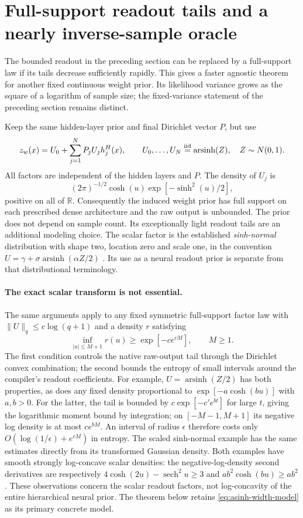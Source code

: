 \section{Full-support readout tails and a nearly inverse-sample oracle}
\label{sec:asinh-width}
The bounded readout in the preceding section can be replaced by a
full-support law if its tails decrease sufficiently rapidly.  This gives
a faster agnostic theorem for another fixed continuous weight prior.
Its likelihood variance grows as the square of a logarithm of sample size; the
fixed-variance statement of the preceding section remains distinct.

Keep the same hidden-layer prior and final Dirichlet vector $P$, but use
\begin{equation}\label{eq:asinh-width-model}
 z_w(x)=U_0+\sum_{j=1}^N P_jU_jh_j^H(x),\qquad
 U_0,\ldots,U_N\stackrel{\rm iid}=\operatorname{arsinh}(Z),\quad
 Z\sim N(0,1).
\end{equation}
All factors are independent of the hidden layers and $P$.
The density of $U_j$ is
\[
 (2\pi)^{-1/2}\cosh(u)\exp[-\sinh^2(u)/2],
\]
positive on all of $\mathbb R$.  Consequently the induced weight prior has full support
on each prescribed dense architecture and the raw output is unbounded.
The prior does not depend on sample count.  Its exceptionally light
readout tails are an additional modeling choice.  The scalar factor is
the established \emph{sinh-normal} distribution with shape two, location
zero and scale one, in the convention
$U=\gamma+\sigma\operatorname{arsinh}(\alpha Z/2)$
\cite{rieck-nedelman,leiva-sinh}.  Its use as a neural readout prior is
separate from that distributional terminology.

\paragraph{The exact scalar transform is not essential.}
The same arguments apply to any fixed symmetric full-support factor law
with $\|U\|_q\le c\log(q+1)$ and a density $r$ satisfying
\[
 \inf_{|u|\le M+1}r(u)\ge\exp[-c e^{cM}],\qquad M\ge1.
\]
The first condition controls the native raw-output tail through the
Dirichlet convex combination; the second bounds the entropy of small
intervals around the compiler's readout coefficients.  For example,
$U=\operatorname{arsinh}(Z/2)$ has both properties, as does any fixed
density proportional to $\exp[-a\cosh(bu)]$ with $a,b>0$.
For the latter, the tail is bounded by
$c\exp[-c' e^{b t}]$ for large $t$, giving the logarithmic moment bound
by integration; on $[-M-1,M+1]$ its negative log density is at most
$c e^{bM}$.  An interval of radius $\epsilon$ therefore costs only
$O(\log(1/\epsilon)+e^{cM})$ in entropy.  The scaled sinh-normal example
has the same estimates directly from its transformed Gaussian density.
Both examples have smooth strongly log-concave scalar densities:
the negative-log-density second derivatives are respectively
$4\cosh(2u)-\operatorname{sech}^2u\ge3$ and
$ab^2\cosh(bu)\ge ab^2$.
These observations concern the scalar readout factors, not log-concavity
of the entire hierarchical neural prior.  The theorem below retains
\eqref{eq:asinh-width-model} as its primary concrete model.

